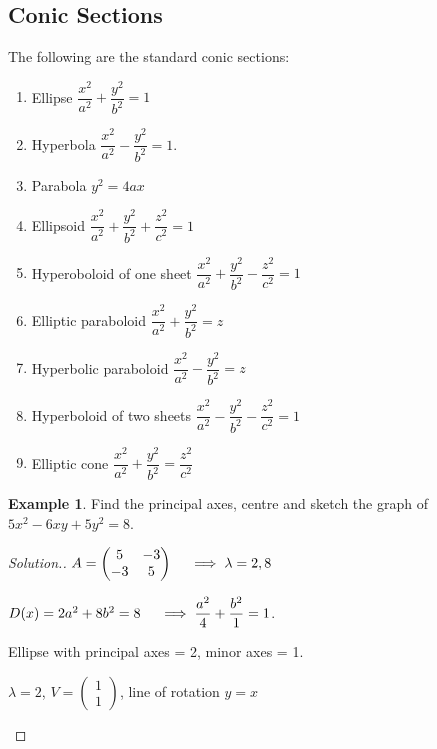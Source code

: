 \documentclass[11pt,a4paper]{article}
\theoremstyle{definition}
\newtheorem{exa}[thm]{Example}
\newenvironment{solution}
  {\renewcommand{\qedsymbol}{}\begin{proof}[\textit{Solution}.]}
  {\end{proof}}
\begin{document}
\subsection{Conic Sections}
The following are the standard conic sections:
\begin{enumerate}
\item Ellipse $\dfrac{x^2}{a^2}+\dfrac{y^2}{b^2}=1$
\item Hyperbola $\dfrac{x^2}{a^2}-\dfrac{y^2}{b^2}=1$.
\item Parabola $y^2=4ax$
\item Ellipsoid $\dfrac{x^2}{a^2}+\dfrac{y^2}{b^2}+\dfrac{z^2}{c^2}=1$
\item Hyperoboloid of one sheet $\dfrac{x^2}{a^2}+\dfrac{y^2}{b^2}-\dfrac{z^2}{c^2}=1$
\item Elliptic paraboloid $\dfrac{x^2}{a^2}+\dfrac{y^2}{b^2}=z$
\item Hyperbolic paraboloid $\dfrac{x^2}{a^2}-\dfrac{y^2}{b^2}=z$
\item Hyperboloid of two sheets $\dfrac{x^2}{a^2}-\dfrac{y^2}{b^2}-\dfrac{z^2}{c^2}=1$
\item Elliptic cone $\dfrac{x^2}{a^2}+\dfrac{y^2}{b^2}=\dfrac{z^2}{c^2}$
\end{enumerate}


\begin{exa}
Find the principal axes, centre and sketch the graph of $5x^2-6xy+5y^2=8$.
\end{exa}


\begin{solution}
$A=
\begin{pmatrix}
5&-3\\-3&5\\
\end{pmatrix}
\hspace{0.4cm}\implies \lambda =2,8$

$D(x)=2a^2+8b^2=8\hspace{0.4cm}\implies \dfrac{a^2}{4}+\dfrac{b^2}{1}=1$.

Ellipse with principal axes = 2, minor axes = 1.

$\lambda=2$, $V=
\begin{pmatrix}
1\\1
\end{pmatrix}
$, line of rotation $y=x$


\begin{figure}[H]
\centering
{}
\end{figure}
\end{solution}
\end{document}
